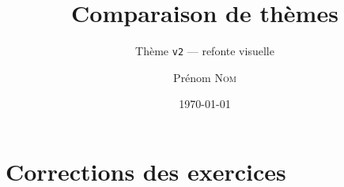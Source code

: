 \documentclass[11pt]{ocots-book}
\title{Comparaison de thèmes}
\subtitle{Thème \texttt{v2} --- refonte visuelle}
\author{Prénom \textsc{Nom}}
\date{\today}
\begin{document}
\maketitle

\ocotscollectsolutions%





\chapter{Corrections des exercices}
\ocotsprintsolutions%



\end{document}
